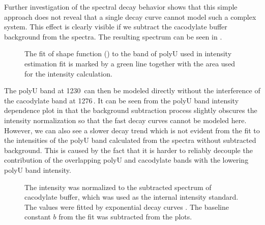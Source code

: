 Further investigation of the spectral decay behavior shows that this simple
approach does not reveal that a single decay curve cannot model such a complex
system.
This effect is clearly visible if we subtract the cacodylate buffer background
from the spectra.
The resulting spectrum can be seen in
.

\begin{figure}
	\centering
	
	\caption[%
		Example UV RR spectrum of polyU dissolved in cacodylate buffer with
	  the cacodylate buffer background subtracted.%
	]{%
		The fit of shape function
		()
		to the band of polyU used in intensity estimation fit is marked by a green
		line together with the area used for the intensity calculation.
	}
	\label{\figlabel{power_optim:triplexes2_pU}}
\end{figure}

The polyU band at 1230\,\icm{} can then be modeled directly without the
interference of the cacodylate band at 1276\,\icm{}.
It can be seen from the polyU band intensity dependence plot in
that the background subtraction process slightly obscures the intensity
normalization so that the fast decay curves cannot be modeled here.
However, we can also see a slower decay trend which is not evident from the fit
to the intensities of the polyU band calculated from the spectra without
subtracted background.
This is caused by the fact that it is harder to reliably decouple
the contribution of the overlapping polyU and cacodylate bands with the
lowering polyU band intensity.

\begin{figure}
	\centering
	
	\caption[%
		Decrease of the integral intensity of the polyU band at 1231\,\icm{}
		for different excitation powers in background-corrected spectra.%
	]{%
		The intensity was normalized to the subtracted spectrum of cacodylate
		buffer, which was used as the internal intensity standard.
		The values were fitted by exponential decay curves
		.
		The baseline constant $b$ from the fit was subtracted from the plots.
	}
	\label{\figlabel{power_optim:triplexes2}}
\end{figure}

